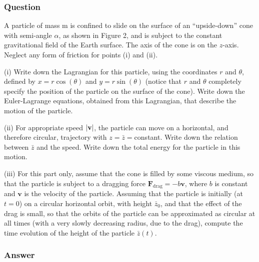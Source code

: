\subsubsection{Question}

A particle of mass m is confined to slide on the surface of an ``upside-down'' cone with semi-angle $\alpha$, as shown in Figure 2, and is subject to the constant gravitational field of the Earth surface. The axis of the cone is on the $z$-axis. Neglect any form of friction for points (i) and (ii).

(i) Write down the Lagrangian for this particle, using the coordinates $r$ and $\theta$, defined by $x = r\cos(\theta)$ and $y = r \sin(\theta)$ (notice that $r$ and $\theta$ completely specify the position of the particle on the surface of the cone). Write down the Euler-Lagrange equations, obtained from this Lagrangian, that describe the motion of the particle.

(ii) For appropriate speed $\abs{\mathbf{v}}$, the particle can move on a horizontal, and therefore circular, trajectory with $z = \bar{z} = $constant. Write down the relation between $\bar{z}$ and the speed. Write down the total energy for the particle in this motion.

(iii) For this part only, assume that the cone is filled by some viscous medium, so that the particle is subject to a dragging force $\mathbf{F}_{\text{drag}}=-b\mathbf{v}$, where $b$ is constant and $\mathbf{v}$ is the velocity of the particle. Assuming that the particle is initially (at $t = 0$) on a circular horizontal orbit, with height $\bar{z}_0$, and that the effect of the drag is small, so that the orbits of the particle can be approximated as circular at all times (with a very slowly decreasing radius, due to the drag), compute the time evolution of the height of the particle $\bar{z}(t)$.


\subsubsection{Answer}

